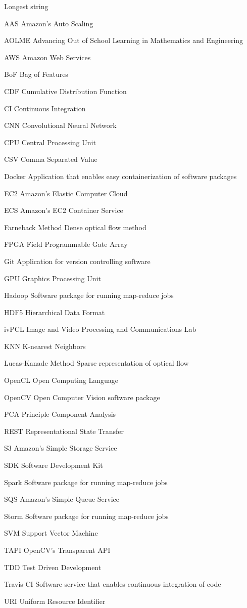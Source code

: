 \documentclass[botnum, fleqn, final]{unmeethesis}
\begin{document}
  \begin{glossary}{Longest  string}
    \item[AAS] Amazon's Auto Scaling
    \item[AOLME] Advancing Out of School Learning in Mathematics and Engineering
    \item[AWS] Amazon Web Services
    \item[BoF] Bag of Features
    \item[CDF] Cumulative Distribution Function
    \item[CI] Continuous Integration
    \item[CNN] Convolutional Neural Network
    \item[CPU] Central Processing Unit
    \item[CSV] Comma Separated Value
    \item[Docker] Application that enables easy containerization of software packages
    \item[EC2] Amazon's Elastic Computer Cloud
    \item[ECS] Amazon's EC2 Container Service
    \item[Farneback Method] Dense optical flow method
    \item[FPGA] Field Programmable Gate Array
    \item[Git] Application for version controlling software
    \item[GPU] Graphics Processing Unit
    \item[Hadoop] Software package for running map-reduce jobs
    \item[HDF5] Hierarchical Data Format
    \item[ivPCL] Image and Video Processing and Communications Lab
    \item[KNN] K-nearest Neighbors
    \item[Lucas-Kanade Method] Sparse representation of optical flow
    \item[OpenCL] Open Computing Language
    \item[OpenCV] Open Computer Vision software package
    \item[PCA] Principle Component Analysis
    \item[REST] Representational State Transfer
    \item[S3]  Amazon's Simple Storage Service
    \item[SDK] Software Development Kit
    \item[Spark] Software package for running map-reduce jobs
    \item[SQS] Amazon's Simple Queue Service
    \item[Storm] Software package for running map-reduce jobs
    \item[SVM] Support Vector Machine
    \item[TAPI] OpenCV's Transparent API
    \item[TDD] Test Driven Development
    \item[Travis-CI] Software service that enables continuous integration of code
    \item[URI] Uniform Resource Identifier
  \end{glossary}
\end{document}
